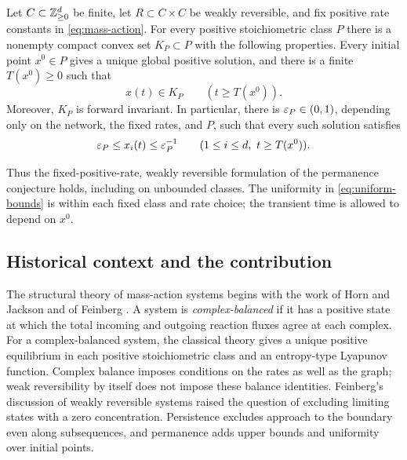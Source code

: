 \begin{theorem}\label{thm:main}
Let $C\subset\mathbb Z_{\geq0}^d$ be finite, let $R\subset C\times C$ be
weakly reversible, and fix positive rate constants in
\eqref{eq:mass-action}. For every positive stoichiometric class $P$ there
is a nonempty compact convex set $K_P\subset P$ with the following
properties. Every initial point $x^0\in P$ gives a unique global positive
solution, and there is a finite $T(x^0)\geq0$ such that
\[
  x(t)\in K_P\qquad(t\geq T(x^0)).
\]
Moreover, $K_P$ is forward invariant. In particular, there is
$\varepsilon_P\in(0,1)$, depending only on the network, the fixed rates, and
$P$, such that every such solution satisfies
\begin{equation}\label{eq:uniform-bounds}
  \varepsilon_P\leq x_i(t)\leq\varepsilon_P^{-1}
  \qquad(1\leq i\leq d,\ t\geq T(x^0)).
\end{equation}
\end{theorem}

Thus the fixed-positive-rate, weakly reversible formulation of the
permanence conjecture holds, including on unbounded classes. The
uniformity in \eqref{eq:uniform-bounds} is within each fixed class and
rate choice; the transient time is allowed to depend on $x^0$.

\subsection{Historical context and the contribution}

The structural theory of mass-action systems begins with the work of
Horn and Jackson and of Feinberg
\cite{HornJackson1972,Feinberg1972}. A system is \emph{complex-balanced}
if it has a positive state at which the total incoming and outgoing
reaction fluxes agree at each complex. For a complex-balanced system,
the classical theory gives a unique positive equilibrium in each
positive stoichiometric class and
an entropy-type Lyapunov function. Complex balance imposes conditions
on the rates as well as the graph; weak reversibility by itself does not
impose these balance identities. Feinberg's discussion of weakly
reversible systems \cite[Remark~6.1.E]{Feinberg1987} raised the question
of excluding limiting states with a zero concentration. Persistence
excludes approach to the boundary even along subsequences, and
permanence adds upper bounds and uniformity over initial points.

